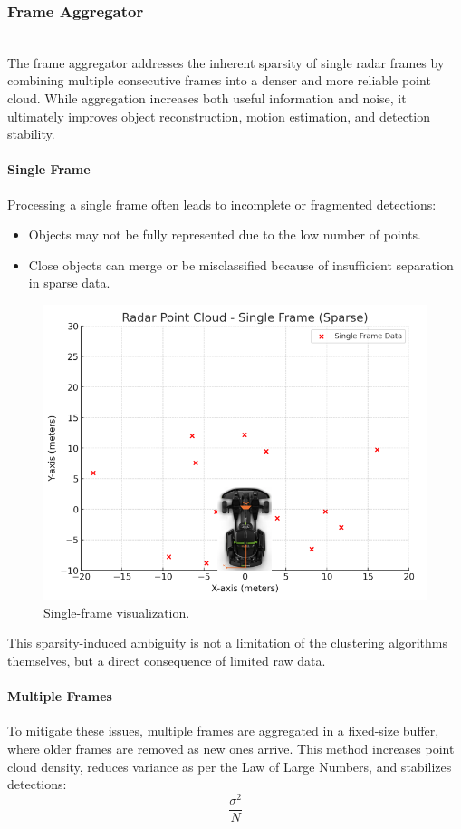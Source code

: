 \vspace{0.5em}
\subsubsection{Frame Aggregator}  
\hfill 
\\
The frame aggregator addresses the inherent sparsity of single radar frames by combining multiple consecutive frames into a denser and more reliable point cloud.  
While aggregation increases both useful information and noise, it ultimately improves object reconstruction, motion estimation, and detection stability.

\paragraph{Single Frame}
Processing a single frame often leads to incomplete or fragmented detections:
\begin{itemize}
    \item Objects may not be fully represented due to the low number of points.
    \item Close objects can merge or be misclassified because of insufficient separation in sparse data.
\end{itemize}

\begin{figure}[!htbp]
    \centering
    \includegraphics[width=0.5\linewidth]{images/singleframe.png}
    \caption{Single-frame visualization.}
    \label{fig:single_frame}
\end{figure}

This sparsity-induced ambiguity is not a limitation of the clustering algorithms themselves, but a direct consequence of limited raw data.

\paragraph{Multiple Frames}
To mitigate these issues, multiple frames are aggregated in a fixed-size buffer, where older frames are removed as new ones arrive.  
This method increases point cloud density, reduces variance as per the Law of Large Numbers, and stabilizes detections:
\begin{equation}
    \frac{\sigma^2}{N}
    \label{eq:variance_per_sample_size}
\end{equation}

